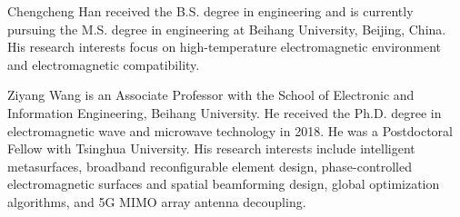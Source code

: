 \documentclass[journal]{IEEEtran}
\begin{document}
\begin{IEEEbiography}{Chengcheng Han}
received the B.S. degree in engineering and is currently pursuing the M.S. degree in engineering at Beihang University, Beijing, China.
His research interests focus on high-temperature electromagnetic environment and electromagnetic compatibility.
\end{IEEEbiography}

\begin{IEEEbiography}{Ziyang Wang}
is an Associate Professor with the School of Electronic and Information Engineering, Beihang University.
He received the Ph.D. degree in electromagnetic wave and microwave technology in 2018.
He was a Postdoctoral Fellow with Tsinghua University.
His research interests include intelligent metasurfaces, broadband reconfigurable element design, phase-controlled electromagnetic surfaces and spatial beamforming design, global optimization algorithms, and 5G MIMO array antenna decoupling.
\end{IEEEbiography}



\end{document}
